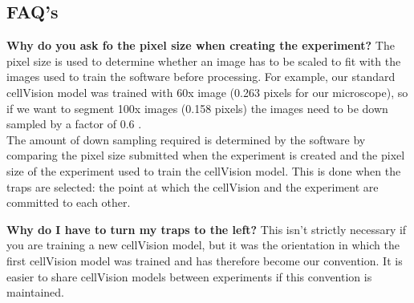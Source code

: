 \subsection{FAQ's}

\textbf{Why do you ask fo the pixel size when creating the experiment?}
The pixel size is used to determine whether an image has to be scaled to fit with the images used to train the software before processing. For example, our standard cellVision model was trained with 60x image (0.263 \microm pixels for our microscope), so if we want to segment 100x images (0.158 \microm pixels) the images need to be down sampled by a factor of $0.6$ .\\
The amount of down sampling required is determined by the software by comparing the pixel size submitted when the experiment is created and the pixel size of the experiment used to train the cellVision model. This is done when the traps are selected: the point at which the cellVision and the experiment are committed to each other.

\textbf{Why do I have to turn my traps to the left?}
This isn't strictly necessary if you are training a new cellVision model, but it was the orientation in which the first cellVision model was trained and has therefore become our convention. It is easier to share cellVision models between experiments if this convention is maintained.
